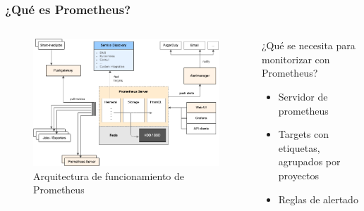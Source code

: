 \begin{frame}[label=intro]
    \frametitle{¿Qué es Prometheus?}
    \begin{columns}
        \begin{column}{0.6\textwidth}
            \begin{figure}[H]
                \includegraphics[width=\textwidth]{include/prometheus_arch.png}
                \caption{Arquitectura de funcionamiento de Prometheus}
            \end{figure}
        \end{column}
        \begin{column}{0.45\textwidth}
            \centering
            ¿Qué se necesita para monitorizar con Prometheus?
            \begin{itemize}
                \item Servidor de prometheus
                \item Targets con etiquetas,\\ agrupados por proyectos
                \item Reglas de alertado
            \end{itemize}
        \end{column}
    \end{columns}
    
\end{frame}